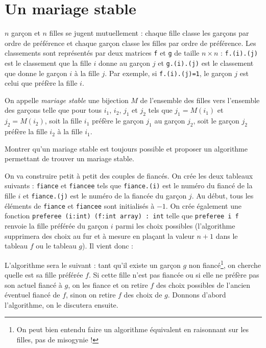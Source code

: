 \renewcommand{\SourceFile}{5-graphes/src/5-3.ml}

\section{Un mariage stable}

$n$ garçon et $n$ filles se jugent mutuellement : chaque fille classe les garçons par ordre de préférence et chaque garçon classe les filles par ordre de préférence. Les classements sont représentés par deux matrices \texttt{f} et \texttt{g} de taille $n \times n$ : \texttt{f.(i).(j)} est le classement que la fille $i$ donne au garçon $j$ et \texttt{g.(i).(j)} est le classement que donne le garçon $i$ à la fille $j$. Par exemple, si \texttt{f.(i).(j)=1}, le garçon $j$ est celui que préfère la fille $i$.
\medskip

On appelle \textit{mariage stable} une bijection $M$ de l'ensemble des filles vers l'ensemble des garçons telle que pour tous $i_1$, $i_2$, $j_1$ et $j_2$ tels que $j_1 = M(i_1)$ et $j_2 = M(i_2)$, soit la fille $i_1$ préfère le garçon $j_1$ au garçon $j_2$, soit le garçon $j_2$ préfère la fille $i_2$ à la fille $i_1$.

\Q
Montrer qu'un mariage stable est toujours possible et proposer un algorithme permettant de trouver un mariage stable.

\Corrige

\Q
On va construire petit à petit des couples de fiancés. On crée les deux tableaux suivants : \texttt{fiance} et \texttt{fiancee} tels que \texttt{fiance.(i)} est le numéro du fiancé de la fille $i$ et \texttt{fiance.(j)} est le numéro de la fiancée du garçon $j$. Au début, tous les éléments de \texttt{fiance} et \texttt{fiancee} sont initialisés à $-1$. On crée également une fonction \texttt{preferee (i:int) (f:int array) : int} telle que \texttt{preferee i f} renvoie la fille préférée du garçon $i$ parmi les choix possibles (l'algorithme supprimera des choix au fur et à mesure en plaçant la valeur $n+1$ dans le tableau $f$ ou le tableau $g$). Il vient donc :



L'algorithme sera le suivant : tant qu'il existe un garçon $g$ non fiancé\footnote{On peut bien entendu faire un algorithme équivalent en raisonnant sur les filles, pas de misogynie !}, on cherche quelle est sa fille préférée $f$. Si cette fille n'est pas fiancée ou si elle ne préfère pas son actuel fiancé à $g$, on les fiance et on retire $f$ des choix possibles de l'ancien éventuel fiancé de $f$, sinon on retire $f$ des choix de $g$. Donnons d'abord l'algorithme, on le discutera ensuite.

